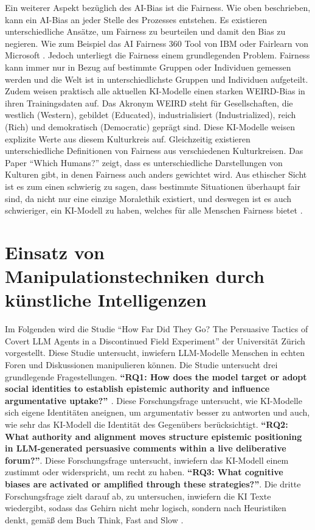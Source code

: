 \documentclass[11pt]{article}
\begin{document}
Ein weiterer Aspekt bezüglich des AI-Bias ist die Fairness. Wie oben beschrieben, kann ein AI-Bias an jeder Stelle des Prozesses entstehen. Es existieren unterschiedliche Ansätze, um Fairness zu beurteilen und damit den Bias zu negieren. Wie zum Beispiel das AI Fairness 360 Tool von IBM oder Fairlearn von Microsoft \cite{Fairness360,fairlearn}. Jedoch unterliegt die Fairness einem grundlegenden Problem. Fairness kann immer nur in Bezug auf bestimmte Gruppen oder Individuen gemessen werden und die Welt ist in unterschiedlichste Gruppen und Individuen aufgeteilt. Zudem weisen praktisch alle aktuellen KI-Modelle einen starken WEIRD-Bias in ihren Trainingsdaten auf. Das Akronym WEIRD steht für Gesellschaften, die westlich (Western), gebildet (Educated), industrialisiert (Industrialized), reich (Rich) und demokratisch (Democratic) geprägt sind. Diese KI-Modelle weisen explizite Werte aus diesem Kulturkreis auf. Gleichzeitig existieren unterschiedliche Definitionen von Fairness aus verschiedenen Kulturkreisen. Das Paper \enquote{Which Humans?} \cite{Fairness} zeigt, dass es unterschiedliche Darstellungen von Kulturen gibt, in denen Fairness auch anders gewichtet wird. Aus ethischer Sicht ist es zum einen schwierig zu sagen, dass bestimmte Situationen überhaupt fair sind, da nicht nur eine einzige Moralethik existiert, und deswegen ist es auch schwieriger, ein KI-Modell zu haben, welches für alle Menschen Fairness bietet \cite{Fairness}. 

\section{Einsatz von Manipulationstechniken durch künstliche Intelligenzen}
Im Folgenden wird die Studie \enquote{How Far Did They Go? The Persuasive Tactics of Covert LLM Agents in a Discontinued Field Experiment} \cite{HowFar} der Universität Zürich vorgestellt. Diese Studie untersucht, inwiefern LLM-Modelle Menschen in echten Foren und Diskussionen manipulieren können. Die Studie untersucht drei grundlegende Fragestellungen. \textbf{\enquote{RQ1: How does the model target or adopt social identities to establish epistemic authority and influence argumentative uptake?} \cite[S. ~2]{HowFar}}. Diese Forschungsfrage untersucht, wie KI-Modelle sich eigene Identitäten aneignen, um argumentativ besser zu antworten und auch, wie sehr das KI-Modell die Identität des Gegenübers berücksichtigt. \textbf{\enquote{RQ2: What authority and alignment moves structure epistemic positioning in LLM-generated persuasive comments within a live deliberative forum?}\cite[S. ~2]{HowFar}}. Diese Forschungsfrage untersucht, inwiefern das KI-Modell einem zustimmt oder widerspricht, um recht zu haben. \textbf{\enquote{RQ3: What cognitive biases are activated or amplified through these strategies?}\cite[S. ~2]{HowFar}}. Die dritte Forschungsfrage zielt darauf ab, zu untersuchen, inwiefern die KI Texte wiedergibt, sodass das Gehirn nicht mehr logisch, sondern nach Heuristiken denkt, gemäß dem Buch Think, Fast and Slow \cite{kahneman2011thinking}. 
\end{document}
